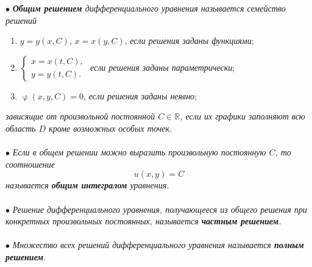 \documentclass[a4paper, 12pt]{report}
\newcommand{\Rm}{\mathbb{R}}
\renewcommand{\varphi}{\upvarphi}
\begin{document}
$\bullet$ \textit{\textbf{Общим решением} дифференциального уравнения называется семейство решений} \begin{enumerate}
	\item $y = y(x,C)$, $x = x(y,C)$, \textit{если решения заданы функциями};
	\item $\begin{cases}
		x = x(t,C),\\
		y = y(t,C).
	\end{cases}$ \textit{если решения заданы параметрически};
\item $\varphi(x,y,C) = 0$, \textit{если решения заданы неявно};
\end{enumerate}
\textit{зависящие от произвольной постоянной $C \in \Rm$, если их графики заполняют всю область $D$ кроме возможных особых точек.}\\\\
$\bullet$ \textit{Если в общем решении можно выразить произвольную постоянную $C$, то соотношение $$u(x,y) = C$$ называется \textbf{общим интегралом} уравнения.}\\\\
$\bullet$ \textit{Решение дифференциального уравнения, получающееся из общего решения при конкретных произвольных постоянных, называется \textbf{частным решением}.}\\\\
$\bullet$ \textit{Множество всех решений дифференциального уравнения называется \textbf{полным решением}.}
\end{document}
